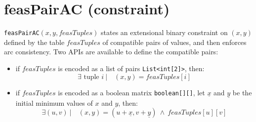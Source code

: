 \label{feaspairac}
\hypertarget{feaspairac}{}

\section{feasPairAC (constraint)}\label{feaspairac:feaspairacconstraint}\hypertarget{feaspairac:feaspairacconstraint}{}

\begin{notedef}
  \texttt{feasPairAC}$(x,y,feasTuples)$ states an extensional binary constraint on $(x,y)$ defined by the table $feasTuples$ of compatible pairs of values, and then enforces arc consistency. Two APIs are available to define the compatible pairs:
\begin{itemize}
	\item if $feasTuples$ is encoded as a list of pairs \texttt{List<int[2]>}, then:
      $$\exists \text{ tuple } i\ |\quad (x,y)=feasTuples[i]$$
	\item if $feasTuples$ is encoded as a boolean matrix \texttt{boolean[][]}, let $\underline{x}$ and  $\underline{y}$ be the initial minimum values of $x$ and $y$, then:
      $$\exists (u,v)\ |\quad (x,y)=(u+\underline{x},v+\underline{y})\ \land\ feasTuples[u][v]$$
\end{itemize}
\end{notedef}

